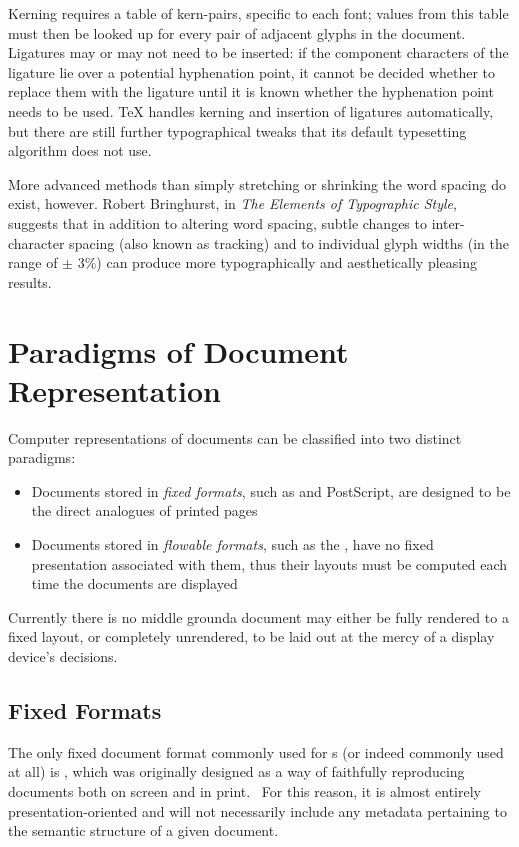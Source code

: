 Kerning requires a table of kern-pairs, specific to each font; values from this table must then be looked up for every pair of adjacent glyphs in the document. Ligatures may or may not need to be inserted: if the component characters of the ligature lie over a potential hyphenation point, it cannot be decided whether to replace them with the ligature until it is known whether the hyphenation point needs to be used. \TeX{} handles kerning and insertion of ligatures automatically, but there are still further typographical tweaks that its default typesetting algorithm does not use.

More advanced methods than simply stretching or shrinking the word spacing do exist, however. Robert Bringhurst, in \emph{The Elements of Typographic Style},~\cite{Bringhurst2008} suggests that in addition to altering word spacing, subtle changes to inter-character spacing (also known as \gls{tracking}) and to individual glyph widths (in the range of $\pm$ 3\%) can produce more typographically and aesthetically pleasing results.




\section{Paradigms of Document Representation}
Computer representations of documents can be classified into two distinct paradigms:
\begin{itemize}
 \item Documents stored in \emph{fixed formats}, such as \pdf{} and PostScript, are designed to be the direct analogues of printed pages
 \item Documents stored in \emph{flowable formats}, such as the \html{}, have no fixed presentation associated with them, thus their layouts must be computed each time the documents are displayed
\end{itemize}
Currently there is no middle ground\ed a document may either be fully rendered to a fixed layout, or completely unrendered, to be laid out at the mercy of a display device's decisions.

\subsection{Fixed Formats}
\label{sec:fixedformats}
The only fixed document format commonly used for \ebook{}s (or indeed commonly used at all) is \pdf{}, which was originally designed as a way of faithfully reproducing documents both on screen and in print.~\cite{Warnock1991} For this reason, it is almost entirely pre\-s\-en\-ta\-tion-oriented and will not necessarily include any metadata pertaining to the semantic structure of a given document.

